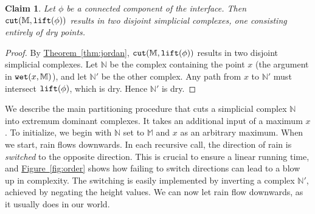 \documentclass[11pt]{article}
\newtheorem{claim}[theorem]{Claim}
\theoremstyle{definition}
\newcommand{\MM}{\mathbb{M}}
\newcommand{\NN}{\mathbb{N}}
\newcommand{\Sec}[1]{\hyperref[sec:#1]{\S\ref*{sec:#1}}} %
\newcommand{\Fig}[1]{\hyperref[fig:#1]{Figure~\ref*{fig:#1}}} %
\newcommand{\Thm}[1]{\hyperref[thm:#1]{Theorem~\ref*{thm:#1}}} %
\newcommand{\cut}{{\tt cut}}
\newcommand{\lift}{{\tt lift}}
\newcommand{\rain}{{\tt rain}}
\newcommand{\wet}{{\tt wet}}
\begin{document}
\begin{claim} \label{clm:cut-int} Let $\phi$ be a connected component of the interface. Then $\cut(\MM,\lift(\phi))$
results in two disjoint simplicial complexes, one consisting entirely of dry points.
\end{claim}

\begin{proof} By \Thm{jordan}, $\cut(\MM,\lift(\phi))$ results in two disjoint simplicial complexes. Let $\NN$ be the complex containing
the point $x$ (the argument in $\wet(x,\MM)$), and let $\NN'$ be the other complex. 
Any path from $x$ to $\NN'$ must intersect $\lift(\phi)$, which is dry. Hence $\NN'$ is dry.
%
%
\end{proof}

We describe the main partitioning procedure that cuts a simplicial complex $\NN$ into extremum
dominant complexes. It takes an additional input of a maximum $x$. To initialize,
we begin with $\NN$ set to $\MM$ and $x$ as an arbitrary maximum. 
When we start, rain flows downwards. In each recursive call, the direction of rain is \emph{switched} to the 
opposite direction. This is crucial to ensure a linear running time, and \Fig{order} shows how failing to switch 
directions can lead to a blow up in complexity. 
The switching is easily implemented by inverting a complex $\NN'$, achieved by negating the height values.
We can now let rain flow downwards, as it usually does in our world.
\end{document}

